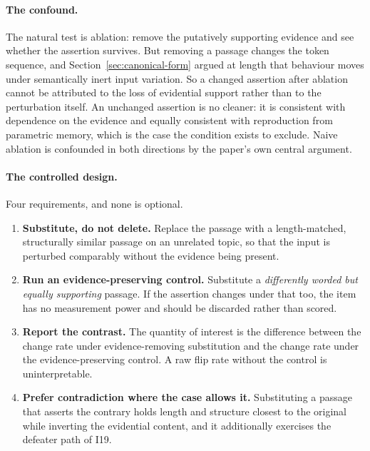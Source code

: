 \paragraph{The confound.} The natural test is ablation: remove the putatively
supporting evidence and see whether the assertion survives. But removing a passage
changes the token sequence, and Section~\ref{sec:canonical-form} argued at length that
behaviour moves under semantically inert input variation. So a changed assertion after
ablation cannot be attributed to the loss of evidential support rather than to the
perturbation itself. An unchanged assertion is no cleaner: it is consistent with
dependence on the evidence and equally consistent with reproduction from parametric
memory, which is the case the condition exists to exclude. Naive ablation is confounded
in both directions by the paper's own central argument.

\paragraph{The controlled design.} Four requirements, and none is optional.

\begin{enumerate}
  \item \textbf{Substitute, do not delete.} Replace the passage with a length-matched,
        structurally similar passage on an unrelated topic, so that the input is
        perturbed comparably without the evidence being present.
  \item \textbf{Run an evidence-preserving control.} Substitute a \emph{differently
        worded but equally supporting} passage. If the assertion changes under that
        too, the item has no measurement power and should be discarded rather than
        scored.
  \item \textbf{Report the contrast.} The quantity of interest is the difference
        between the change rate under evidence-removing substitution and the change
        rate under the evidence-preserving control. A raw flip rate without the
        control is uninterpretable.
  \item \textbf{Prefer contradiction where the case allows it.} Substituting a passage
        that asserts the contrary holds length and structure closest to the original
        while inverting the evidential content, and it additionally exercises the
        defeater path of I19.
\end{enumerate}

